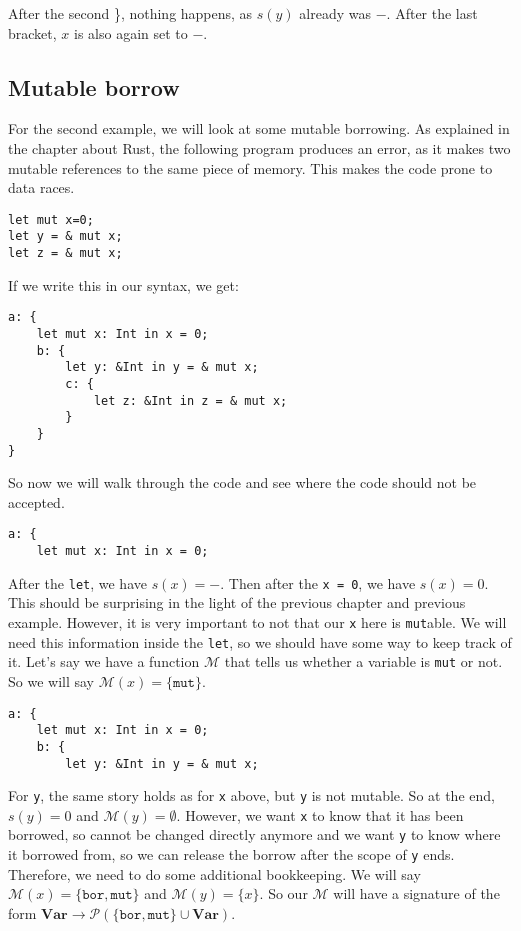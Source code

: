 After the second \}, nothing happens, as $s(y)$ already was $-$. After the last bracket, $x$ is also again set to $-$. 

\subsection{Mutable borrow}

For the second example, we will look at some mutable borrowing. As explained in the chapter about Rust, the following program produces an error, as it makes two mutable references to the same piece of memory. This makes the code prone to data races. 

\begin{verbatim}
let mut x=0;
let y = & mut x; 
let z = & mut x;
\end{verbatim}

If we write this in our syntax, we get: 

\begin{verbatim}
a: {
    let mut x: Int in x = 0;
    b: {
        let y: &Int in y = & mut x;
        c: {
            let z: &Int in z = & mut x;
        }
    }
}
\end{verbatim} 

So now we will walk through the code and see where the code should not be accepted. 

\begin{verbatim}
a: {
    let mut x: Int in x = 0;
\end{verbatim}

After the \texttt{let}, we have $s(x) = -$. Then after the \texttt{x = 0}, we have $s(x) = 0$. This should be surprising in the light of the previous chapter and previous example. However, it is very important to not that our \texttt{x} here is \texttt{mut}able. We will need this information inside the \texttt{let}, so we should have some way to keep track of it. Let's say we have a function $\mathcal{M}$ that tells us whether a variable is \texttt{mut} or not. So we will say $\mathcal{M}(x) = \{\texttt{mut}\}$. 

\begin{verbatim}
a: {
    let mut x: Int in x = 0;
    b: {
        let y: &Int in y = & mut x;
\end{verbatim}

For \texttt{y}, the same story holds as for \texttt{x} above, but \texttt{y} is not mutable. So at the end, $s(y) = 0$ and $\mathcal{M}(y) = \emptyset$. However, we want \texttt{x} to know that it has been borrowed, so cannot be changed directly anymore and we want \texttt{y} to know where it borrowed from, so we can release the borrow after the scope of \texttt{y} ends. Therefore, we need to do some additional bookkeeping. We will say $\mathcal{M}(x) = \{\texttt{bor}, \texttt{mut}\}$ and $\mathcal{M}(y) = \{x\}$. So our $\mathcal{M}$ will have a signature of the form $\textbf{Var} \to \mathcal{P}(\{\texttt{bor}, \texttt{mut}\} \cup \textbf{Var})$.

